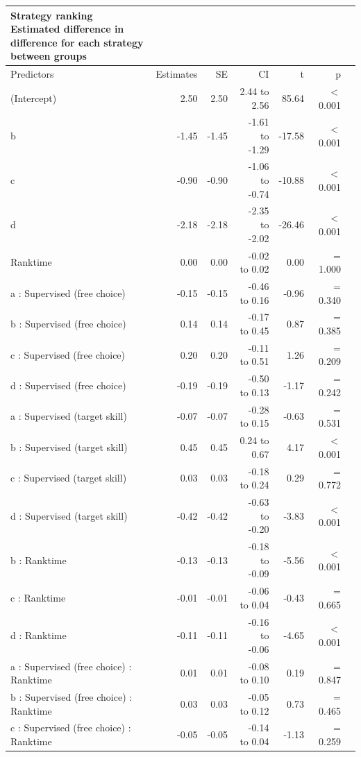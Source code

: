 \documentclass{article}
\begin{document}
\setlength{\LTpost}{0mm}
\begin{longtable}{lrrrrrl}
\caption*{
{\large Strategy ranking} \\ 
{\small Estimated difference in difference for each strategy between groups}
} \\ 
\toprule
Predictors & Estimates & SE & CI & t & p \\ 
\midrule\addlinespace[2.5pt]
(Intercept) & 2.50 & 2.50 & 2.44 to 2.56 & 85.64 &  $<$ 0.001 \\ 
b & -1.45 & -1.45 & -1.61 to -1.29 & -17.58 &  $<$  0.001 \\ 
c & -0.90 & -0.90 & -1.06 to -0.74 & -10.88 &  $<$  0.001 \\ 
d & -2.18 & -2.18 & -2.35 to -2.02 & -26.46 &  $<$  0.001 \\ 
Ranktime & 0.00 & 0.00 & -0.02 to 0.02 & 0.00 &  =  1.000 \\ 
a : Supervised (free choice) & -0.15 & -0.15 & -0.46 to 0.16 & -0.96 &  =  0.340 \\ 
b : Supervised (free choice) & 0.14 & 0.14 & -0.17 to 0.45 & 0.87 &  =  0.385 \\ 
c : Supervised (free choice) & 0.20 & 0.20 & -0.11 to 0.51 & 1.26 &  =  0.209 \\ 
d : Supervised (free choice) & -0.19 & -0.19 & -0.50 to 0.13 & -1.17 &  =  0.242 \\ 
a : Supervised (target skill) & -0.07 & -0.07 & -0.28 to 0.15 & -0.63 &  =  0.531 \\ 
b : Supervised (target skill) & 0.45 & 0.45 & 0.24 to 0.67 & 4.17 &  $<$  0.001 \\ 
c : Supervised (target skill) & 0.03 & 0.03 & -0.18 to 0.24 & 0.29 &  =  0.772 \\ 
d : Supervised (target skill) & -0.42 & -0.42 & -0.63 to -0.20 & -3.83 &  $<$  0.001 \\ 
b : Ranktime & -0.13 & -0.13 & -0.18 to -0.09 & -5.56 &  $<$  0.001 \\ 
c : Ranktime & -0.01 & -0.01 & -0.06 to 0.04 & -0.43 &  =  0.665 \\ 
d : Ranktime & -0.11 & -0.11 & -0.16 to -0.06 & -4.65 &  $<$  0.001 \\ 
a : Supervised (free choice) : Ranktime & 0.01 & 0.01 & -0.08 to 0.10 & 0.19 &  =  0.847 \\ 
b : Supervised (free choice) : Ranktime & 0.03 & 0.03 & -0.05 to 0.12 & 0.73 &  =  0.465 \\ 
c : Supervised (free choice) : Ranktime & -0.05 & -0.05 & -0.14 to 0.04 & -1.13 &  =  0.259 \\ 

\end{longtable}
\end{document}
